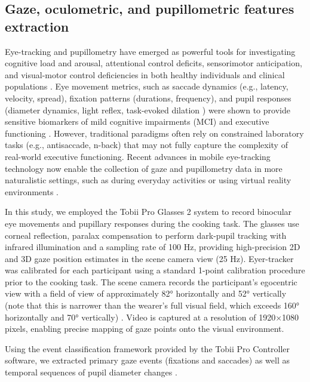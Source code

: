 \subsection{Gaze, oculometric, and pupillometric features extraction}
\label{sec:chapter_4_eye_tracking}
    Eye-tracking and pupillometry have emerged as powerful tools for investigating cognitive load and arousal, attentional control deficits, sensorimotor anticipation, and visual-motor control deficiencies in both healthy individuals and clinical populations \cite{Wolf2023, Opwonya2024, Tao2020}. Eye movement metrics, such as saccade dynamics (e.g., latency, velocity, spread), fixation patterns (durations, frequency), and pupil responses (diameter dynamics, light reflex, task-evoked dilation \cite{Castellotti2025, Petrosino2025, Strauch2022}) were shown to provide sensitive biomarkers of mild cognitive impairments (MCI) and executive functioning \cite{Graham2024,Tao2020}. However, traditional paradigms often rely on constrained laboratory tasks (e.g., antisaccade, n-back) that may not fully capture the complexity of real-world executive functioning. Recent advances in mobile eye-tracking technology now enable the collection of gaze and pupillometry data in more naturalistic settings, such as during everyday activities \cite{Kasneci2017} or using virtual reality environments \cite{Xu2024}.
    
    In this study, we employed the Tobii Pro Glasses 2 system \cite{Onkhar2023} to record binocular eye movements and pupillary responses during the cooking task. The glasses use corneal reflection, paralax compensation to perform  dark-pupil tracking with infrared illumination and a sampling rate of 100 Hz, providing high-precision 2D and 3D gaze position estimates in the scene camera view (25 Hz). Eyer-tracker was calibrated for each participant using a standard 1-point calibration procedure prior to the cooking task. The scene camera records the participant’s egocentric view with a field of view of approximately 82° horizontally and 52° vertically (note that this is narrower than the wearer’s full visual field, which exceeds 160° horizontally and 70° vertically) \cite{TobiiProGlasses2Manual}. Video is captured at a resolution of 1920×1080 pixels, enabling precise mapping of gaze points onto the visual environment.

    Using the event classification framework provided by the Tobii Pro Controller software, we extracted primary gaze events (fixations and saccades) as well as temporal sequences of pupil diameter changes \cite{Onkhar2023}. 
    
